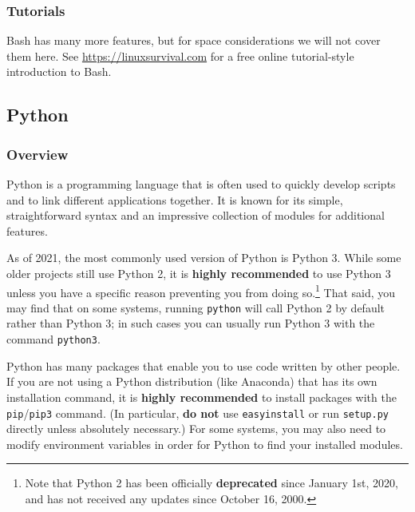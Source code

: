 \documentclass[12pt]{article}
\begin{document}
\subsubsection{Tutorials}
Bash has many more features, but for space considerations we will not cover them here.
See \url{https://linuxsurvival.com} for a free online tutorial-style introduction to Bash.

\subsection{Python}
\subsubsection{Overview}
Python is a programming language that is often used to quickly develop scripts and to link different applications together.
It is known for its simple, straightforward syntax and an impressive collection of modules for additional features.

As of 2021, the most commonly used version of Python is Python 3.
While some older projects still use Python 2, it is \textbf{highly recommended} to use Python 3 unless you have a specific reason preventing you from doing so.\footnote{
    Note that Python 2 has been officially \textbf{deprecated} since January 1st, 2020, and has not received any updates since October 16, 2000.
}
That said, you may find that on some systems, running \texttt{python} will call Python 2 by default rather than Python 3; in such cases you can usually run Python 3 with the command \texttt{python3}.

Python has many packages that enable you to use code written by other people.
If you are not using a Python distribution (like Anaconda) that has its own installation command, it is \textbf{highly recommended} to install packages with the \texttt{pip}/\texttt{pip3} command.
(In particular, \textbf{do not} use \texttt{easy\ttul install} or run \texttt{setup.py} directly unless absolutely necessary.)
For some systems, you may also need to modify environment variables in order for Python to find your installed modules.
\end{document}

